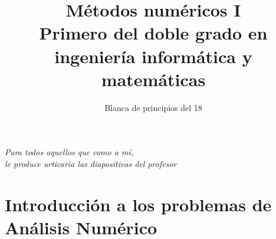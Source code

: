 \documentclass[a4paper , 11pt , spanish]{book}
\title{ 
Métodos numéricos I \\
\large
Primero del doble grado en ingeniería informática y matemáticas}
\author{Blanca de principios del 18}
\begin{document}
\maketitle

\begin{flushright}
\textit{Para todos aquellos que como a mí, \\ le produce urticaria las diapositivas del profesor}

\end{flushright}

\newpage
\chapter{Introducción a los problemas de Análisis Numérico }

\end{document}
